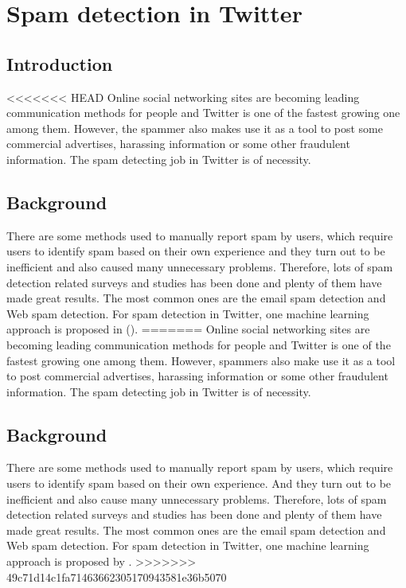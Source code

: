\documentclass[../proposal.tex]{subfiles}
\begin{document}
\section{Spam detection in Twitter}

\subsection{Introduction}
<<<<<<< HEAD
Online social networking sites are becoming leading communication methods for people and Twitter is one of the fastest growing one among them. However, the spammer also makes use it as a tool to post some commercial advertises, harassing information or some other fraudulent information. The spam detecting job in Twitter is of necessity.

\subsection{Background}
There are some methods used to manually report spam by users, which require users to identify spam based on their own experience and they turn out to be inefficient and also caused many unnecessary problems. Therefore, lots of spam detection related surveys and studies has been done and plenty of them have made great results. The most common ones are the email spam detection and Web spam detection. For spam detection in Twitter, one machine learning approach is proposed in (\cite{wang2010detecting}).
=======
Online social networking sites are becoming leading communication methods for
people and Twitter is one of the fastest growing one among them. However, 
spammers also make use it as a tool to post commercial advertises,
harassing information or some other fraudulent information. The spam detecting
job in Twitter is of necessity.

\subsection{Background}
There are some methods used to manually report spam by users, which require
users to identify spam based on their own experience. And they turn out to be
inefficient and also cause many unnecessary problems. Therefore, lots of spam
detection related surveys and studies has been done and plenty of them have
made great results. The most common ones are the email spam detection and Web
spam detection. For spam detection in Twitter, one machine learning approach is
proposed by \cite{wang2010don}.
>>>>>>> 49c71d14c1fa71463662305170943581e36b5070
\end{document}
